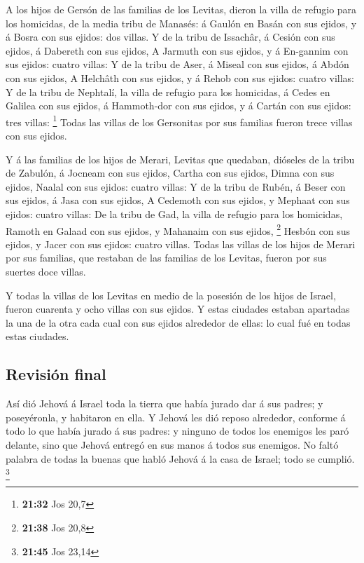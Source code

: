  A los hijos de Gersón de las familias de los Levitas,
dieron la villa de refugio para los homicidas, de la media tribu de
Manasés: á Gaulón en Basán con sus ejidos, y á Bosra con sus ejidos: dos
villas.  Y de la tribu de Issachâr, á Cesión con sus
ejidos, á Dabereth con sus ejidos,  A Jarmuth con sus
ejidos, y á En-gannim con sus ejidos: cuatro villas:  Y
de la tribu de Aser, á Miseal con sus ejidos, á Abdón con sus ejidos,
 A Helchâth con sus ejidos, y á Rehob con sus ejidos:
cuatro villas:  Y de la tribu de Nephtalí, la villa de
refugio para los homicidas, á Cedes en Galilea con sus ejidos, á
Hammoth-dor con sus ejidos, y á Cartán con sus ejidos: tres villas:
\footnote{\textbf{21:32} Jos 20,7}  Todas las villas de
los Gersonitas por sus familias fueron trece villas con sus ejidos.

 Y á las familias de los hijos de Merari, Levitas que
quedaban, dióseles de la tribu de Zabulón, á Jocneam con sus ejidos,
Cartha con sus ejidos,  Dimna con sus ejidos, Naalal con
sus ejidos: cuatro villas:  Y de la tribu de Rubén, á
Beser con sus ejidos, á Jasa con sus ejidos,  A Cedemoth
con sus ejidos, y Mephaat con sus ejidos: cuatro villas: 
De la tribu de Gad, la villa de refugio para los homicidas, Ramoth en
Galaad con sus ejidos, y Mahanaim con sus ejidos, \footnote{\textbf{21:38}
  Jos 20,8}  Hesbón con sus ejidos, y Jacer con sus
ejidos: cuatro villas.  Todas las villas de los hijos de
Merari por sus familias, que restaban de las familias de los Levitas,
fueron por sus suertes doce villas.

 Y todas la villas de los Levitas en medio de la posesión
de los hijos de Israel, fueron cuarenta y ocho villas con sus ejidos.
 Y estas ciudades estaban apartadas la una de la otra
cada cual con sus ejidos alrededor de ellas: lo cual fué en todas estas
ciudades.

\hypertarget{revisiuxf3n-final}{%
\subsection{Revisión final}\label{revisiuxf3n-final}}

 Así dió Jehová á Israel toda la tierra que había jurado
dar á sus padres; y poseyéronla, y habitaron en ella.  Y
Jehová les dió reposo alrededor, conforme á todo lo que había jurado á
sus padres: y ninguno de todos los enemigos les paró delante, sino que
Jehová entregó en sus manos á todos sus enemigos.  No
faltó palabra de todas la buenas que habló Jehová á la casa de Israel;
todo se cumplió. \footnote{\textbf{21:45} Jos 23,14}

